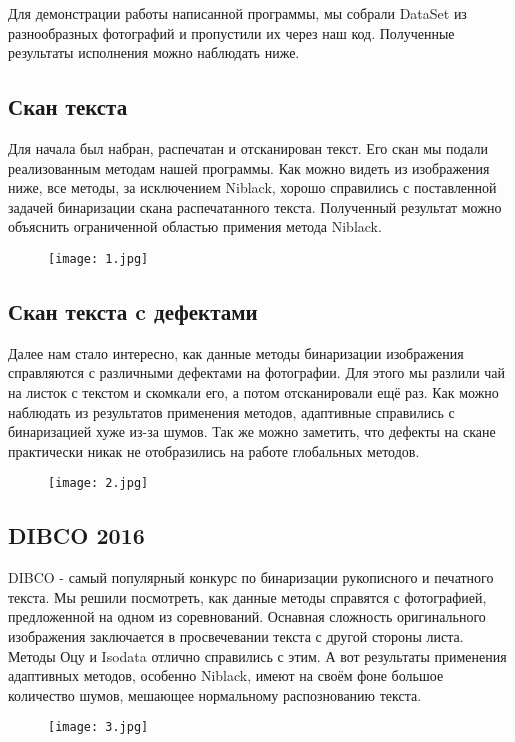\documentclass[a4paper,12pt]{article}
\begin{document}
Для демонстрации работы написанной программы, мы собрали DataSet из разнообразных фотографий и пропустили их через наш код. Полученные результаты исполнения можно наблюдать ниже.

\subsection*{Скан текста}

Для начала был набран, распечатан и отсканирован текст. Его скан мы подали реализованным методам нашей программы. Как можно видеть из изображения ниже, все методы, за исключением Niblack, хорошо справились с поставленной задачей бинаризации скана распечатанного текста. Полученный результат можно объяснить ограниченной областью примения метода Niblack.
\begin{figure}[h!]
    \centering	
    \texttt{[image: 1.jpg]}
    \label{1_1}
\end{figure}
\newpage
\subsection*{Скан текста c дефектами}

Далее нам стало интересно, как данные методы бинаризации изображения справляются с различными дефектами на фотографии. Для этого мы разлили чай на листок с текстом и скомкали его, а потом отсканировали ещё раз. Как можно наблюдать из результатов применения методов, адаптивные справились с бинаризацией хуже из-за шумов. Так же можно заметить, что дефекты на скане практически никак не отобразились на работе глобальных методов. 
\begin{figure}[h!]
    \centering	
    \texttt{[image: 2.jpg]}
    \label{1_1}
\end{figure}

\subsection*{DIBCO 2016}
DIBCO - самый популярный конкурс по бинаризации рукописного и печатного текста. Мы решили посмотреть, как данные методы справятся с фотографией, предложенной на одном из соревнований. Оснавная сложность оригинального изображения заключается в просвечевании текста с другой стороны листа. Методы Оцу и Isodata отлично справились с этим. А вот результаты применения адаптивных методов, особенно Niblack, имеют на своём фоне большое количество шумов, мешающее нормальному распознованию текста.  
\begin{figure}[h!]
    \centering	
    \texttt{[image: 3.jpg]}
    \label{1_1}
\end{figure}
\end{document}
